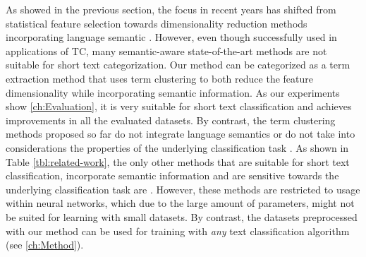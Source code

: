 As showed in the previous section, the focus in recent years has shifted  
from statistical feature selection towards dimensionality reduction methods incorporating language
semantic \cite{Blei2003, Blei2010, le2014distributed, wang2016semantic, Chen2011}. 
However, even though successfully used in applications of TC, many semantic-aware state-of-the-art methods  
are not suitable for short text categorization. 
Our method can be categorized as a term extraction method that uses term clustering to both 
reduce the feature dimensionality while incorporating semantic information. 
As our experiments show \ref{ch:Evaluation}, it is very suitable for short text classification
and achieves improvements in all the evaluated datasets.
By contrast, the term clustering methods proposed so far do not integrate language 
semantics \cite{baker1998distributional, slonim2001power} or do not take into considerations 
the properties of the underlying classification task \cite{ma2015using, wang2016semantic}. 
As shown in Table \ref{tbl:related-work}, the only other methods that are suitable for short text classification,
incorporate semantic information and are sensitive towards the underlying classification task are 
\cite{lai2015recurrent, kim2014convolutional}. However, these methods are restricted to usage within 
neural networks, which due to the large amount of parameters, might not be suited for learning with small datasets. 
By contrast, the datasets preprocessed with our method can be used for training  with \emph{any} text classification 
algorithm (see \ref{ch:Method}).

